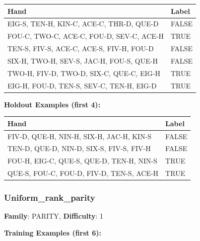 \documentclass[10pt,a4paper]{article}
\begin{document}
\begin{small}
\begin{tabular}{p{8cm}l}
\toprule
Hand & Label \\
\midrule
EIG-S, TEN-H, KIN-C, ACE-C, THR-D, QUE-D & \textcolor{negative}{FALSE} \\
FOU-C, TWO-C, ACE-C, FOU-D, SEV-C, ACE-H & \textcolor{positive}{TRUE} \\
TEN-S, FIV-S, ACE-C, ACE-S, FIV-H, FOU-D & \textcolor{negative}{FALSE} \\
SIX-H, TWO-H, SEV-S, JAC-H, FOU-S, QUE-H & \textcolor{negative}{FALSE} \\
TWO-H, FIV-D, TWO-D, SIX-C, QUE-C, EIG-H & \textcolor{positive}{TRUE} \\
EIG-H, FOU-D, TEN-S, SEV-C, TEN-H, EIG-D & \textcolor{positive}{TRUE} \\
\bottomrule
\end{tabular}
\end{small}

\textbf{Holdout Examples (first 4):}

\begin{small}
\begin{tabular}{p{8cm}l}
\toprule
Hand & Label \\
\midrule
FIV-D, QUE-H, NIN-H, SIX-H, JAC-H, KIN-S & \textcolor{negative}{FALSE} \\
TEN-D, QUE-D, NIN-D, SIX-S, FIV-S, FIV-H & \textcolor{negative}{FALSE} \\
FOU-H, EIG-C, QUE-S, QUE-D, TEN-H, NIN-S & \textcolor{positive}{TRUE} \\
QUE-S, FOU-C, FOU-D, FIV-D, TEN-S, ACE-H & \textcolor{positive}{TRUE} \\
\bottomrule
\end{tabular}
\end{small}

\vspace{0.5cm}

\subsubsection{Uniform\_rank\_parity}

\textbf{Family}: PARITY, \textbf{Difficulty}: 1

\textbf{Training Examples (first 6):}
\end{document}
